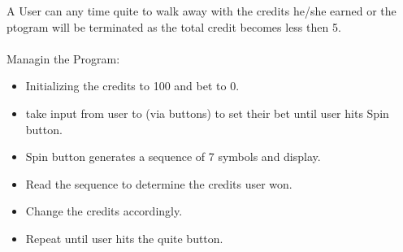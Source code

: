 \documentclass{article}
\begin{document}
A User can any time quite to walk away with the credits he/she earned or the ptogram will be terminated as the total credit becomes less then 5.\\ \\

Managin the Program:
\begin{itemize}
\item Initializing the credits to 100 and bet to 0.
\item take input from user to (via buttons) to set their bet until user hits Spin button.
\item Spin button generates a sequence of 7 symbols and display.
\item Read the sequence to determine the credits user won.
\item Change the credits accordingly.
\item Repeat until user hits the quite button.
\end{itemize}
\end{document}
